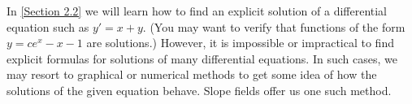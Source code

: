 \documentclass{ximera}
\begin{document}
 
 
 
In \ref{Section 2.2} we will learn how to find an explicit solution of a differential equation such as $y'=x+y$.  (You may want to verify that functions of the form $y=ce^x-x-1$ are solutions.)  However, it is impossible or impractical to find explicit formulas for solutions of many differential equations. In such cases, we may resort to
graphical or numerical methods to get some idea of how the solutions
of the given equation behave. Slope fields offer us one such method.
 
 
 
\end{document}
